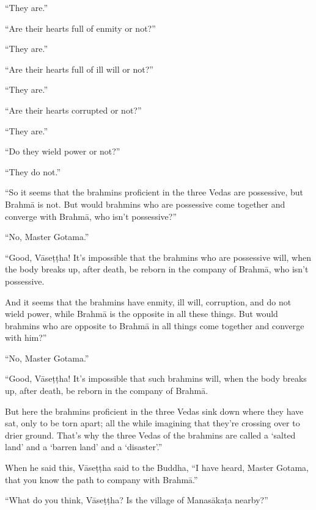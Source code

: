 \documentclass[12pt,openany]{book}%
\begin{document}
“They are.” 

“Are their hearts full of enmity or not?” 

“They are.” 

“Are their hearts full of ill will or not?” 

“They are.” 

“Are their hearts corrupted or not?” 

“They are.” 

“Do they wield power or not?” 

“They do not.” 

“So it seems that the brahmins proficient in the three Vedas are possessive, but \textsanskrit{Brahmā} is not. But would brahmins who are possessive come together and converge with \textsanskrit{Brahmā}, who isn’t possessive?” 

“No, Master Gotama.” 

“Good, \textsanskrit{Vāseṭṭha}! It’s impossible that the brahmins who are possessive will, when the body breaks up, after death, be reborn in the company of \textsanskrit{Brahmā}, who isn’t possessive. 

And it seems that the brahmins have enmity, ill will, corruption, and do not wield power, while \textsanskrit{Brahmā} is the opposite in all these things. But would brahmins who are opposite to \textsanskrit{Brahmā} in all things come together and converge with him?” 

“No, Master Gotama.” 

“Good, \textsanskrit{Vāseṭṭha}! It’s impossible that such brahmins will, when the body breaks up, after death, be reborn in the company of \textsanskrit{Brahmā}. 

But here the brahmins proficient in the three Vedas sink down where they have sat, only to be torn apart; all the while imagining that they’re crossing over to drier ground. That’s why the three Vedas of the brahmins are called a ‘salted land’ and a ‘barren land’ and a ‘disaster’.” 

When he said this, \textsanskrit{Vāseṭṭha} said to the Buddha, “I have heard, Master Gotama, that you know the path to company with \textsanskrit{Brahmā}.” 

“What do you think, \textsanskrit{Vāseṭṭha}? Is the village of \textsanskrit{Manasākaṭa} nearby?” 
\end{document}
